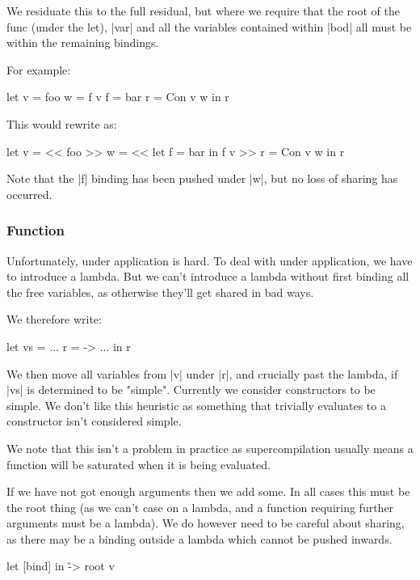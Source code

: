 \documentclass{sigplanconf}
\begin{document}
We residuate this to the full residual, but where we require that the root of the func (under the let), |var| and all the variables contained within |bod| all must be within the remaining bindings.

For example:

\begin{code}
let v = foo
    w = f v
    f = bar
    r = Con v w
in r
\end{code}

This would rewrite as:

\begin{code}
let v = << foo >>
    w = << let f = bar in f v >>
    r = Con v w
in r
\end{code}

Note that the |f| binding has been pushed under |w|, but no loss of sharing has occurred.

\subsubsection{Function}

Unfortunately, under application is hard. To deal with under application, we have to introduce a lambda. But we can't introduce a lambda without first binding all the free variables, as otherwise they'll get shared in bad ways.

We therefore write:

\begin{code}
let vs  = ...
    r  = \x -> ...
in r
\end{code}

We then move all variables from |v| under |r|, and crucially past the lambda, if |vs| is determined to be "simple". Currently we consider constructors to be simple. We don't like this heuristic as something that trivially evaluates to a constructor isn't considered simple.

We note that this isn't a problem in practice as supercompilation usually means a function will be saturated when it is being evaluated.


If we have not got enough arguments then we add some. In all cases this must be the root thing (as we can't case on a lambda, and a function requiring further arguments must be a lambda). We do however need to be careful about sharing, as there may be a binding outside a lambda which cannot be pushed inwards.

\begin{code}
let [bind]
in \v -> root v
\end{code}
\end{document}
